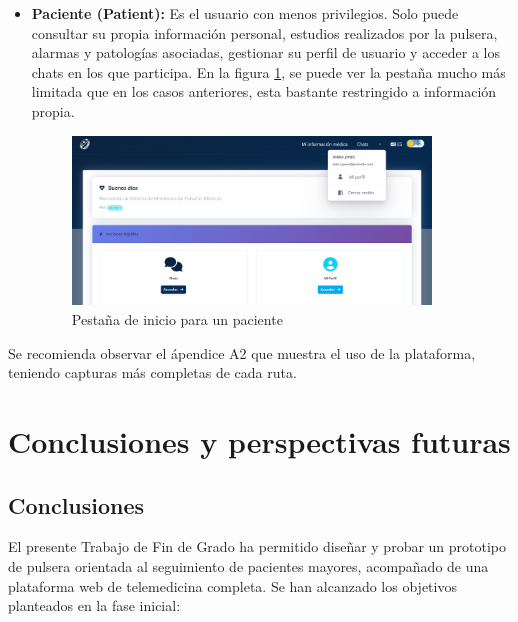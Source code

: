 \documentclass[12pt, a4paper]{article}
\begin{document}
\begin{itemize}
	
	\item \textbf{Paciente (Patient):}  
	Es el usuario con menos privilegios. Solo puede consultar su propia información personal, estudios realizados por la pulsera, alarmas y patologías asociadas, gestionar su perfil de usuario y acceder a los chats en los que participa. En la figura \ref{fig:paco}, se puede ver la pestaña mucho más limitada que en los casos anteriores, esta bastante restringido a información propia.
	
	
	\begin{figure}[htbp]
		\centering
		\includegraphics[width=0.9\textwidth]{images/pov_paciente.png}
		\caption[Ejemplo]{Pestaña de inicio para un paciente}
		\label{fig:paco}
	\end{figure}
\end{itemize}

Se recomienda observar el ápendice A2 que muestra el uso de la plataforma, teniendo capturas más completas de cada ruta.

\section{Conclusiones y perspectivas futuras}
\subsection{Conclusiones}

El presente Trabajo de Fin de Grado ha permitido diseñar y probar un prototipo de pulsera orientada al seguimiento de pacientes mayores, acompañado de una plataforma web de telemedicina completa. Se han alcanzado los objetivos planteados en la fase inicial:
\end{document}
